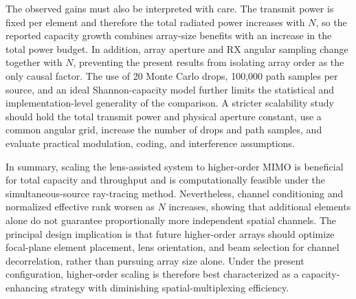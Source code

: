 The observed gains must also be interpreted with care. The transmit power is fixed per element and therefore the total radiated power increases with $N$, so the reported capacity growth combines array-size benefits with an increase in the total power budget. In addition, array aperture and RX angular sampling change together with $N$, preventing the present results from isolating array order as the only causal factor. The use of 20 Monte Carlo drops, 100{,}000 path samples per source, and an ideal Shannon-capacity model further limits the statistical and implementation-level generality of the comparison. A stricter scalability study should hold the total transmit power and physical aperture constant, use a common angular grid, increase the number of drops and path samples, and evaluate practical modulation, coding, and interference assumptions.

In summary, scaling the lens-assisted system to higher-order MIMO is beneficial for total capacity and throughput and is computationally feasible under the simultaneous-source ray-tracing method. Nevertheless, channel conditioning and normalized effective rank worsen as $N$ increases, showing that additional elements alone do not guarantee proportionally more independent spatial channels. The principal design implication is that future higher-order arrays should optimize focal-plane element placement, lens orientation, and beam selection for channel decorrelation, rather than pursuing array size alone. Under the present configuration, higher-order scaling is therefore best characterized as a capacity-enhancing strategy with diminishing spatial-multiplexing efficiency.
